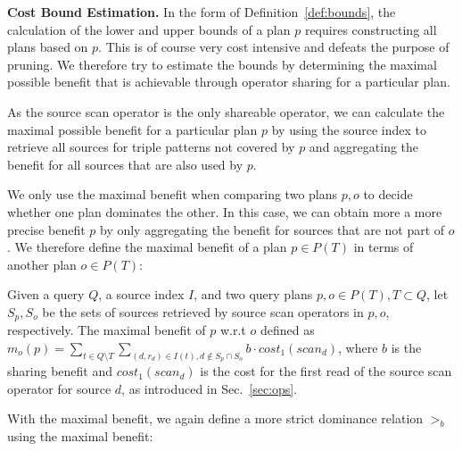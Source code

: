 
\textbf{Cost Bound Estimation.} In the form of
Definition~\ref{def:bounds}, the calculation of the lower and upper
bounds of a plan $p$ requires constructing all plans based on
$p$. This is of course very cost intensive and defeats the purpose of
pruning. We therefore try to estimate the bounds by determining the
maximal possible benefit that is achievable through operator sharing
for a particular plan. 

As the source scan operator is the only shareable operator, we can
calculate the maximal possible benefit for a particular plan $p$ by
using the source index to retrieve all sources for triple patterns not
covered by $p$ and aggregating the benefit for all sources that are
also used by $p$.

We only use the maximal benefit when comparing two plans $p,o$ to decide
whether one plan dominates the other. In this case, we can obtain more
a more precise benefit $p$ by only aggregating the benefit for sources
that are not part of $o$. We therefore define the maximal benefit of a
plan $p \in P(T)$ in terms of another plan $o \in P(T)$:

\begin{definition}
  Given a query $Q$, a source index $I$, and two query plans $p,o \in
  P(T), T \subset Q$, let $S_p,S_o$ be the sets of sources retrieved
  by source scan operators in $p,o$, respectively. The maximal benefit
  of $p$ w.r.t $o$ defined as $m_o(p) = \sum_{t \in Q \setminus T}
  \sum_{(d,r_d) \in I(t), d \notin S_p \cap S_o } b \cdot
  cost_1(scan_d)$, where $b$ is the sharing benefit and
  $cost_1(scan_d)$ is the cost for the first read of the source scan
  operator for source $d$, as introduced in Sec.~\ref{sec:ops}.
\end{definition}

With the maximal benefit, we again define a more strict dominance
relation $>_b$ using the maximal benefit:

